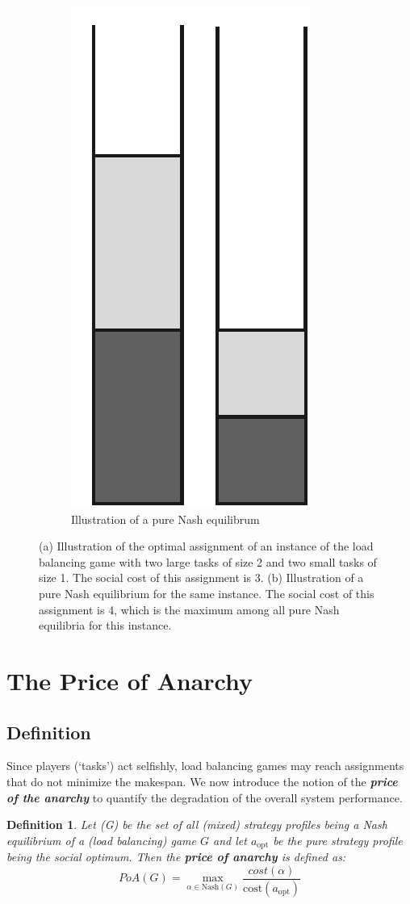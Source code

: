 \documentclass[a4paper,11pt]{article}
\newtheorem{definition}[theorem]{Definition}
\newcommand{\cost}{\text{cost}}
\newcommand{\Nash}{\text{Nash}}
\newcommand{\opt}{\text{opt}}
\begin{document}
\begin{figure}
\begin{subfigure}{0.3\textwidth}
                \includegraphics[scale=0.4]{figuurb.pdf}
                \caption{Illustration of a pure Nash equilibrum}
                \label{fig:b}
        \end{subfigure}
        \caption{(a) Illustration of the optimal assignment of an instance of the load balancing game with two large tasks of size 2 and two small tasks of size 1. The social cost of this assignment is 3. (b) Illustration of a pure Nash equilibrium for the same instance. The social cost of this assignment is 4, which is the maximum among all pure Nash equilibria for this instance.}
\end{figure}


\section{The Price of Anarchy}
\subsection{Definition}
Since players (`tasks') act selfishly, load balancing games may reach assignments that do not minimize the makespan. We now introduce the notion of the \emph{\textbf{price of the anarchy}} to quantify the degradation of the overall system performance.
\begin{definition}\cite{10}
Let \Nash(G) be the set of all (mixed) strategy profiles being a Nash equilibrium of a (load balancing) game $G$ and let $a_{\opt}$ be the pure strategy profile being the social optimum. Then the \emph{\textbf{price of anarchy}} is defined as:
$$PoA(G) = \displaystyle\max_{\alpha \in \Nash(G)} {\frac{cost(\alpha)}{\cost(a_{\opt})}}$$
\end{definition}
\end{document}
